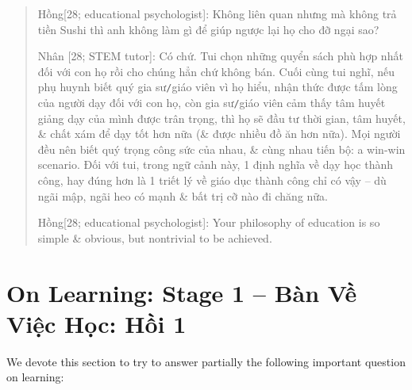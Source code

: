 \documentclass[12pt,oneside]{book}
\begin{document}
\begin{quote}
	{\sf Hồng[28; educational psychologist]}: Không liên quan nhưng mà không trả tiền Sushi thì anh không làm gì để giúp ngược lại họ cho đỡ ngại sao?
	
	{\sf Nhân [28; STEM tutor]}: Có chứ. Tui chọn những quyển sách phù hợp nhất đối với con họ rồi cho chúng hẳn chứ không bán. Cuối cùng tui nghĩ, nếu phụ huynh biết quý gia sư{\tt/}giáo viên vì họ hiểu, nhận thức được tấm lòng của người dạy đối với con họ, còn gia sư{\tt/}giáo viên cảm thấy tâm huyết giảng dạy của mình được trân trọng, thì họ sẽ đầu tư thời gian, tâm huyết, \& chất xám để dạy tốt hơn nữa (\& được nhiều đồ ăn hơn nữa). Mọi người đều nên biết quý trọng công sức của nhau, \& cùng nhau tiến bộ: a win-win scenario. Đối với tui, trong ngữ cảnh này, 1 định nghĩa về dạy học thành công, hay đúng hơn là 1 triết lý về giáo dục thành công chỉ có vậy -- dù ngãi mập, ngãi heo có mạnh \& bất trị cỡ nào đi chăng nữa.
	
	{\sf Hồng[28; educational psychologist]}: Your philosophy of education is so simple \& obvious, but nontrivial to be achieved.
\end{quote}


\chapter{On Learning: Stage 1 -- Bàn Về Việc Học: Hồi 1}
\label{sect: learning}
\minitoc
We devote this section to try to answer partially the following important question on learning:
\end{document}
